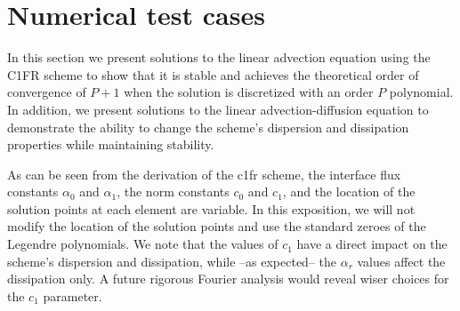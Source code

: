 \section{Numerical test cases}
\label{sec:num_cases}
In this section we present solutions to the linear advection equation using the C1FR scheme to show that it is stable and achieves the theoretical order of convergence of $P+1$ when the solution is discretized with an order $P$ polynomial. In addition, we present solutions to the linear advection-diffusion equation to demonstrate the ability to change the scheme's dispersion and dissipation properties while maintaining stability.

As can be seen from the derivation of the \gls{c1fr} scheme, the interface flux constants $\alpha_0$ and $\alpha_1$, the norm constants $c_0$ and $c_1$, and the location of the solution points at each element are variable. In this exposition, we will not modify the location of the solution points and use the standard zeroes of the Legendre polynomials. We note that the values of $c_1$ have a direct impact on the scheme's dispersion and dissipation, while --as expected-- the $\alpha_r$ values affect the dissipation only. A future rigorous Fourier analysis would reveal wiser choices for the $c_1$ parameter.




